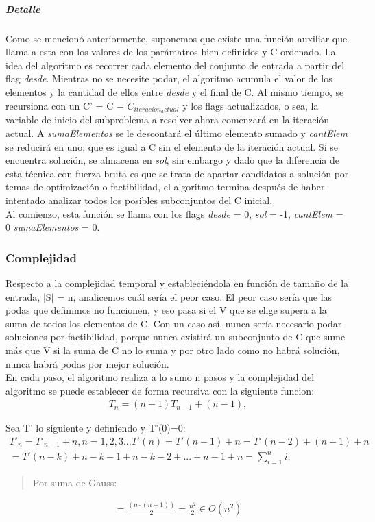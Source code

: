 \documentclass[7pt,a4paper]{article}
\begin{document}
\subparagraph{Detalle} Como se mencionó anteriormente, suponemos que existe una función auxiliar que llama a esta con los valores de los parámatros bien definidos y C ordenado. La idea del algoritmo es recorrer cada elemento del conjunto de entrada a partir del flag {\it desde}. Mientras no se necesite podar, el algoritmo acumula el valor de los elementos y la cantidad de ellos entre {\it desde} y el final de C. Al mismo tiempo, se recursiona con un C' = C $-$ ${C_{iteracion_actual}}$ y los flags actualizados, o sea, la variable de inicio del subproblema a resolver ahora comenzará en la iteración actual. A {\it sumaElementos} se le descontará el último elemento sumado y {\it cantElem} se reducirá en uno; que es igual a C sin el elemento de la iteración actual. Si se encuentra solución, se almacena en {\it sol}, sin embargo y dado que la diferencia de esta técnica con fuerza bruta es que se trata de apartar candidatos a solución por temas de optimización o factibilidad, el algoritmo termina después de haber intentado analizar todos los posibles subconjuntos del C inicial. \\
Al comienzo, esta función se llama con los flags {\it desde} = 0, {\it sol} = -1, {\it cantElem} = 0 {\it sumaElementos} = 0.
\subsubsection{Complejidad}

Respecto a la complejidad temporal y estableciéndola en función de tamaño de la entrada, $|$S$|$ = n, analicemos cuál sería el peor caso. El peor caso sería que las podas que definimos no funcionen, y eso pasa si el V que se elige supera a la suma de todos los elementos de C. Con un caso así, nunca sería necesario podar soluciones por factibilidad, porque nunca existirá un subconjunto de C que sume más que V si la suma de C no lo suma y por otro lado como no habrá solución, nunca habrá podas por mejor solución.\\
En cada paso, el algoritmo realiza a lo sumo n pasos y la complejidad del algoritmo se puede establecer de forma recursiva con la siguiente funcion:
\begin{align}
 T_{n} = (n-1) T_{n-1} + (n-1) ,
\end{align}

Sea T' lo siguiente y definiendo y T'(0)=0:
\begin{align}
 T'_{n} = T'_{n-1} + n,  n = 1, 2, 3...
 T'(n) = T'(n-1) + n = T'(n-2) + (n-1) + n \\  = T'(n-k) + n-k-1 + n-k-2 + ... + n-1 + n = \sum_{i=1}^{n}i,
 \end{align}
 \begin{verse}
 Por suma de Gauss:
 \end{verse}
 \begin{align}
 = \frac{(n\cdot(n+1))}{2} = \frac{n^{2}}{2} \in O(n^{2})
\end{align}
\end{document}
